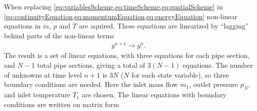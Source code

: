 When replacing \cref{eq:variablesScheme,eq:timeScheme,eq:spatialScheme} in \cref{eq:continuityEquation,eq:momentumEquation,eq:energyEquation} non-linear equations in $\dot m$, $p$ and $T$ are aquired. These equations are linearized by ``lagging'' behind parts of the non-linear terms \cite{thomas1998numerical}
\begin{align}
    y^{n+1} \rightarrow y^{n}
. \label{eq:lagTerms}
\end{align}
The result is a set of linear equations, with three equations for each pipe section, and $N-1$ total pipe sections, giving a total of $3(N-1)$ equations. The number of unknowns at time level $n+1$ is $3N$ ($N$ for each state variable), so three boundary conditions are needed. Here the inlet mass flow $\dot m_{1}$, outlet pressure $p_{N}$, and inlet temperature $T_{1}$ are chosen.
The linear equations with boundary conditions are written on matrix form


